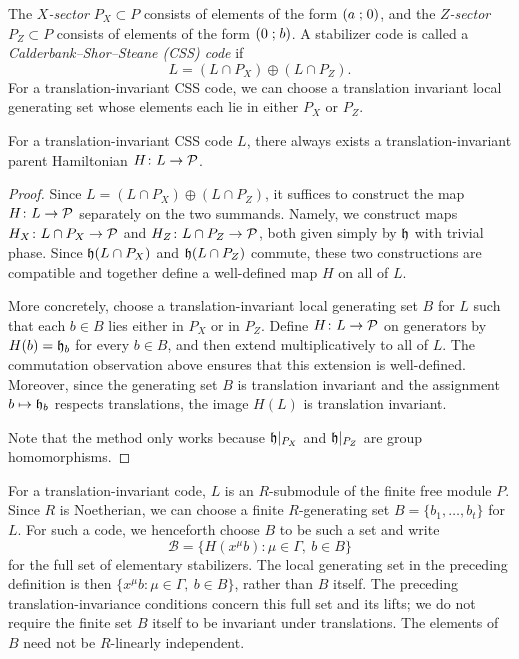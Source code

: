 \documentclass[11pt]{amsart}
\begin{document}
\begin{defn}
The \emph{$X$-sector} $P_X\subset P$ consists of elements of the form
$(a\mathrel{;} 0)$, and the \emph{$Z$-sector} $P_Z\subset P$ consists of elements
of the form $(0\mathrel{;} b)$. A stabilizer code is called a
\emph{Calderbank--Shor--Steane (CSS) code} if
\[
L=(L\cap P_X)\oplus(L\cap P_Z).
\]
For a translation-invariant CSS code, we can choose a translation invariant
local generating set whose elements each lie in either $P_X$ or $P_Z$.
\end{defn}

\begin{prop}\label{prop:css-translation-invariant-parent}
For a translation-invariant CSS code $L$, there always exists a translation-invariant parent Hamiltonian $H\colon L\to \mathcal{P}$.
\end{prop} 
\begin{proof}
Since $L=(L\cap P_X)\oplus (L\cap P_Z)$, it suffices to construct the map $H\colon L\to \mathcal{P}$ separately on the two summands. Namely, we construct maps $H_X\colon L\cap P_X\to \mathcal{P}$ and $H_Z\colon L\cap P_Z\to \mathcal{P}$, both given simply by $\mathfrak{h}$ with trivial phase. Since $\mathfrak{h}(L\cap P_X)$ and $\mathfrak{h}(L\cap P_Z)$ commute, these two constructions are compatible and together define a well-defined map $H$ on all of $L$.

More concretely, choose a translation-invariant local generating set $B$ for $L$ such that each $b\in B$ lies either in $P_X$ or in $P_Z$. Define $H\colon L\to \mathcal{P}$ on generators by
$H(b)=\mathfrak{h}_b$
for every $b\in B$, and then extend multiplicatively to all of $L$. The commutation observation above ensures that this extension is well-defined. Moreover, since the generating set $B$ is translation invariant and the assignment $b\mapsto \mathfrak{h}_b$ respects translations, the image $H(L)$ is translation invariant.

Note that the method only works because $\mathfrak{h}|_{P_X}$ and $\mathfrak{h}|_{P_Z}$ are group homomorphisms. 
\end{proof}

For a translation-invariant code, $L$ is an $R$-submodule of the finite free module $P$. Since $R$ is Noetherian, we can choose a finite $R$-generating set $B=\{b_1,\ldots,b_t\}$ for $L$. For such a code, we henceforth choose $B$ to be such a set and write
\[
\mathcal B=\{H(x^\mu b):\mu\in\Gamma,\ b\in B\}
\]
for the full set of elementary stabilizers. The local generating set in the preceding definition is then $\{x^\mu b:\mu\in\Gamma,\ b\in B\}$, rather than $B$ itself. The preceding translation-invariance conditions concern this full set and its lifts; we do not require the finite set $B$ itself to be invariant under translations. The elements of $B$ need not be $R$-linearly independent.
\end{document}

